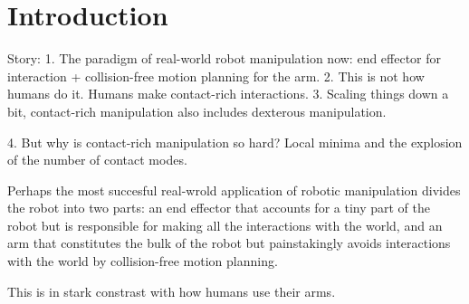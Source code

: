 \chapter{Introduction}
Story: 
1. The paradigm of real-world robot manipulation now: end effector for interaction + collision-free motion planning for the arm.
2. This is not how humans do it. Humans make contact-rich interactions. 
3. Scaling things down a bit, contact-rich manipulation also includes dexterous manipulation. 

4. But why is contact-rich manipulation so hard? Local minima and the explosion of the number of contact modes. 


Perhaps the most succesful real-wrold application of robotic manipulation divides the robot into two parts: an end effector that accounts for a tiny part of the robot but is responsible for making all the interactions with the world, and an arm that constitutes the bulk of the robot but painstakingly avoids interactions with the world by collision-free motion planning.

This is in stark constrast with how humans use their arms. 


